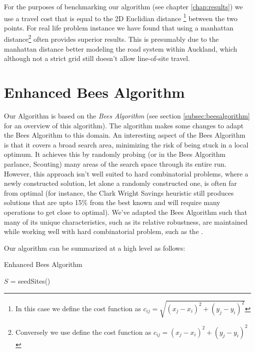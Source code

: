 For the purposes of benchmarking our algorithm (see chapter \ref{chap:results}) we use a travel cost that is equal to the 2D Euclidian distance \footnote{In this case we define the cost function as $c_{ij} = \sqrt{(x_j-x_i)^2 + (y_j-y_i)^2}$} between the two points. For real life problem instance we have found that using a manhattan distance\footnote{Conversely we use define the cost function as $c_{ij} = (x_j-x_i)^2 + (y_j-y_i)^2$} often provides superior results. This is presumably due to the manhattan distance better modeling the road system within Auckland, which although not a strict grid still doesn't allow line-of-site travel.

\section{Enhanced Bees Algorithm}
\label{sec:enhancedbeesalgorithm}

Our Algorithm is based on the \emph{Bees Algorithm} (see section \ref{subsec:beesalgorithm} for an overview of this algorithm). The algorithm makes some changes to adapt the Bees Algorithm to this domain. An interesting aspect of the Bees Algorithm is that it covers a broad search area, minimizing the risk of being stuck in a local optimum. It achieves this by randomly probing (or in the Bees Algorithm parlance, Scouting) many areas of the search space through its entire run. However, this approach isn't well suited to hard combinatorial problems, where a newly constructed solution, let alone a randomly constructed one, is often far from optimal (for instance, the Clark Wright Savings heuristic still produces solutions that are upto 15\% from the best known and will require many operations to get close to optimal). We've adapted the Bees Algorithm such that many of its unique characteristics, such as its relative robustness, are maintained while working well with hard combinatorial problem, such as the \VRP.

Our algorithm can be summarized at a high level as follows:

\begin{algorithm}[H]
   \caption{Enhanced Bees Algorithm}
   $S$ = seedSites() \\

\end{algorithm}

